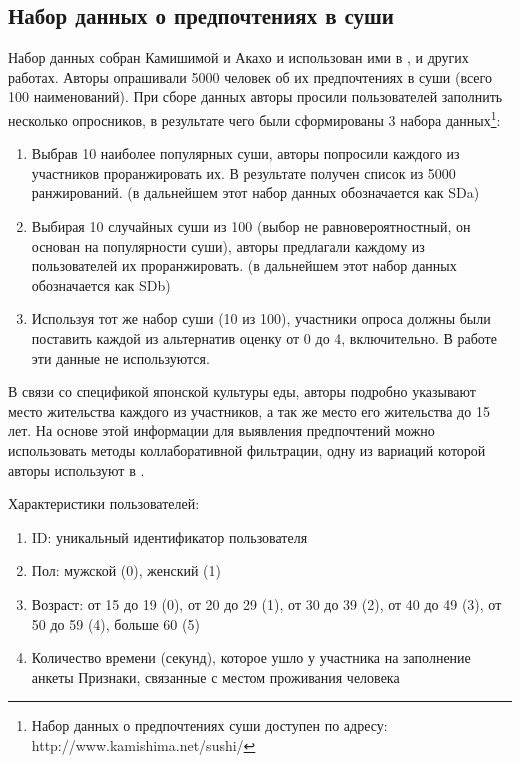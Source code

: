 	\subsection{Набор данных о предпочтениях в суши}
		Набор данных собран Камишимой и Акахо и использован ими в \cite{Kamishima:2003}, \cite{Kamishima:2006} и других работах. Авторы опрашивали 5000 человек об их предпочтениях в суши (всего 100 наименований). При сборе данных авторы просили пользователей заполнить несколько опросников, в результате чего были сформированы 3 набора данных\footnote{Набор данных о предпочтениях суши доступен по адресу: http://www.kamishima.net/sushi/}:
		\begin{enumerate}[itemsep=-1.5mm]
			\item Выбрав 10 наиболее популярных суши, авторы попросили каждого из участников проранжировать их. В результате получен список из 5000 ранжирований. (в дальнейшем этот набор данных обозначается как SDa)
			\item Выбирая 10 случайных суши из 100 (выбор не равновероятностный, он основан на популярности суши), авторы предлагали каждому из пользователей их проранжировать. (в дальнейшем этот набор данных обозначается как SDb)
			\item Используя тот же набор суши (10 из 100), участники опроса должны были поставить каждой из альтернатив оценку от 0 до 4, включительно. В работе эти данные не используются.
		\end{enumerate}
		
		В связи со спецификой японской культуры еды, авторы подробно указывают место жительства каждого из участников, а так же место его жительства до 15 лет. На основе этой информации для выявления предпочтений можно использовать методы коллаборативной фильтрации\cite{Ricci:2011}, одну из вариаций которой авторы используют в \cite{Kamishima:2003}.
		
		\vspace{1em}
		
		\noindent Характеристики пользователей:
		\vspace{-0.7em}
		\begin{enumerate}[itemsep=-1.5mm]
			\item ID: уникальный идентификатор пользователя
			\item Пол: мужской (0), женский (1)
			\item Возраст: от 15 до 19 (0), от 20 до 29 (1), от 30 до 39 (2), от 40 до 49 (3), от 50 до 59 (4), больше 60 (5)
			\item Количество времени (секунд), которое ушло у участника на заполнение анкеты
			 Признаки, связанные с местом проживания человека
		\end{enumerate}
		
